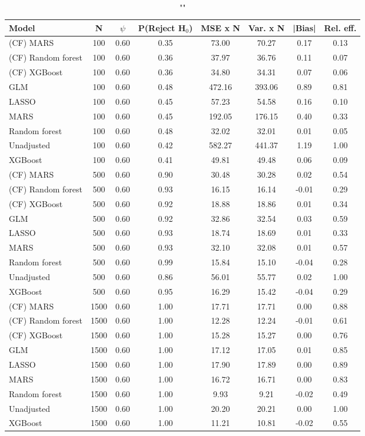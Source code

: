 \begin{table}
\centering
\caption{""}
\begin{tabular}{lccccccc}
\toprule
Model & N & $\psi$ & P(Reject H$_0$) & MSE x N & Var. x N & |Bias| & Rel. eff.\\ \midrule
(CF) MARS & 100 & 0.60 & 0.35 &  73.00 &  70.27 &  0.17 & 0.13 \\ 
(CF) Random forest & 100 & 0.60 & 0.36 &  37.97 &  36.76 &  0.11 & 0.07 \\ 
(CF) XGBoost & 100 & 0.60 & 0.36 &  34.80 &  34.31 &  0.07 & 0.06 \\ 
GLM & 100 & 0.60 & 0.48 & 472.16 & 393.06 &  0.89 & 0.81 \\ 
LASSO & 100 & 0.60 & 0.45 &  57.23 &  54.58 &  0.16 & 0.10 \\ 
MARS & 100 & 0.60 & 0.45 & 192.05 & 176.15 &  0.40 & 0.33 \\ 
Random forest & 100 & 0.60 & 0.48 &  32.02 &  32.01 &  0.01 & 0.05 \\ 
Unadjusted & 100 & 0.60 & 0.42 & 582.27 & 441.37 &  1.19 & 1.00 \\ 
XGBoost & 100 & 0.60 & 0.41 &  49.81 &  49.48 &  0.06 & 0.09 \\ \addlinespace 
(CF) MARS & 500 & 0.60 & 0.90 &  30.48 &  30.28 &  0.02 & 0.54 \\ 
(CF) Random forest & 500 & 0.60 & 0.93 &  16.15 &  16.14 & -0.01 & 0.29 \\ 
(CF) XGBoost & 500 & 0.60 & 0.92 &  18.88 &  18.86 &  0.01 & 0.34 \\ 
GLM & 500 & 0.60 & 0.92 &  32.86 &  32.54 &  0.03 & 0.59 \\ 
LASSO & 500 & 0.60 & 0.93 &  18.74 &  18.69 &  0.01 & 0.33 \\ 
MARS & 500 & 0.60 & 0.93 &  32.10 &  32.08 &  0.01 & 0.57 \\ 
Random forest & 500 & 0.60 & 0.99 &  15.84 &  15.10 & -0.04 & 0.28 \\ 
Unadjusted & 500 & 0.60 & 0.86 &  56.01 &  55.77 &  0.02 & 1.00 \\ 
XGBoost & 500 & 0.60 & 0.95 &  16.29 &  15.42 & -0.04 & 0.29 \\ \addlinespace 
(CF) MARS & 1500 & 0.60 & 1.00 &  17.71 &  17.71 &  0.00 & 0.88 \\ 
(CF) Random forest & 1500 & 0.60 & 1.00 &  12.28 &  12.24 & -0.01 & 0.61 \\ 
(CF) XGBoost & 1500 & 0.60 & 1.00 &  15.28 &  15.27 &  0.00 & 0.76 \\ 
GLM & 1500 & 0.60 & 1.00 &  17.12 &  17.05 &  0.01 & 0.85 \\ 
LASSO & 1500 & 0.60 & 1.00 &  17.90 &  17.89 &  0.00 & 0.89 \\ 
MARS & 1500 & 0.60 & 1.00 &  16.72 &  16.71 &  0.00 & 0.83 \\ 
Random forest & 1500 & 0.60 & 1.00 &   9.93 &   9.21 & -0.02 & 0.49 \\ 
Unadjusted & 1500 & 0.60 & 1.00 &  20.20 &  20.21 &  0.00 & 1.00 \\ 
XGBoost & 1500 & 0.60 & 1.00 &  11.21 &  10.81 & -0.02 & 0.55 \\
\bottomrule
\end{tabular}
\end{table}

